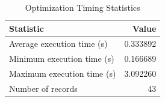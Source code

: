 
\begin{table}[h!]
\centering
\begin{tabular}{l r}
\hline
Statistic & Value \\
\hline
Average execution time (s) & 0.333892 \\
Minimum execution time (s) & 0.166689 \\
Maximum execution time (s) & 3.092260 \\
Number of records & 43 \\
\hline
\end{tabular}
\caption{Optimization Timing Statistics}
\end{table}
